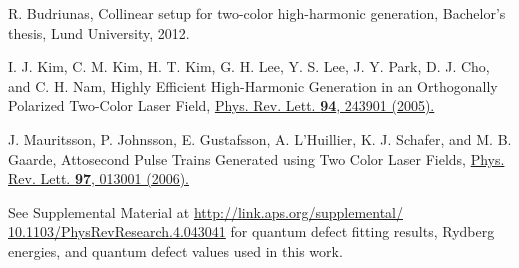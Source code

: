 \documentclass[7pt]{article}
\begin{document}
\begin{multicols}{2}
\begin{thebibliography}{30}
\bibitem{} R. Budriunas, Collinear setup for two-color high-harmonic generation, Bachelor’s thesis, Lund University, 2012.
\vspace{-1.5mm}

\bibitem{} I. J. Kim, C. M. Kim, H. T. Kim, G. H. Lee, Y. S.
Lee, J. Y. Park, D. J. Cho, and C. H. Nam, Highly Efficient High-Harmonic Generation in an Orthogonally Polarized Two-Color Laser Field, \href{https://journals.aps.org/prl/abstract/10.1103/PhysRevLett.94.243901}{Phys. Rev. Lett. \textbf{94}, 243901
(2005).}
\vspace{-1.5mm}

\bibitem{} J. Mauritsson, P. Johnsson, E. Gustafsson, A. L’Huillier, K. J.
Schafer, and M. B. Gaarde, Attosecond Pulse Trains Generated
using Two Color Laser Fields, \href{https://journals.aps.org/prl/abstract/10.1103/PhysRevLett.97.013001}{Phys. Rev. Lett. \textbf{97}, 013001
(2006).}
\vspace{-1.5mm}

\bibitem{} See Supplemental Material at \url{http://link.aps.org/supplemental/
10.1103/PhysRevResearch.4.043041} for quantum defect fitting
results, Rydberg energies, and quantum defect values used in
this work.


\end{thebibliography}

\end{multicols}
\end{document}
